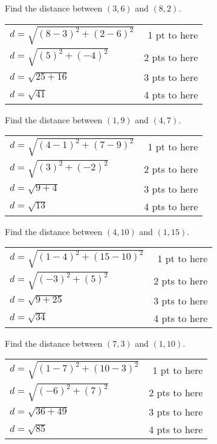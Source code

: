 {
	Find the distance between $(3, 6)$ and $(8,2)$.
}
{
	\begin{tabular}{l r}
	$d=\sqrt{(8-3)^2+(2-6)^2}$ & 1 pt to here\\
	$d=\sqrt{(5)^2+(-4)^2}$ & 2 pts to here\\
	$d=\sqrt{25+16}$ & 3 pts to here\\
	$d=\sqrt{41}$ & 4 pts to here
	\end{tabular}
}

{
	Find the distance between $(1, 9)$ and $(4,7)$.
}
{
	\begin{tabular}{l r}
	$d=\sqrt{(4-1)^2+(7-9)^2}$ & 1 pt to here\\
	$d=\sqrt{(3)^2+(-2)^2}$ & 2 pts to here\\
	$d=\sqrt{9+4}$ & 3 pts to here\\
	$d=\sqrt{13}$ & 4 pts to here
	\end{tabular}
}

{
	Find the distance between $(4, 10)$ and $(1,15)$.
}
{
	\begin{tabular}{l r}
	$d=\sqrt{(1-4)^2+(15-10)^2}$ & 1 pt to here\\
	$d=\sqrt{(-3)^2+(5)^2}$ & 2 pts to here\\
	$d=\sqrt{9+25}$ & 3 pts to here\\
	$d=\sqrt{34}$ & 4 pts to here
	\end{tabular}
}

{
	Find the distance between $(7, 3)$ and $(1,10)$.
}
{
	\begin{tabular}{l r}
	$d=\sqrt{(1-7)^2+(10-3)^2}$ & 1 pt to here\\
	$d=\sqrt{(-6)^2+(7)^2}$ & 2 pts to here\\
	$d=\sqrt{36+49}$ & 3 pts to here\\
	$d=\sqrt{85}$ & 4 pts to here
	\end{tabular}
}
